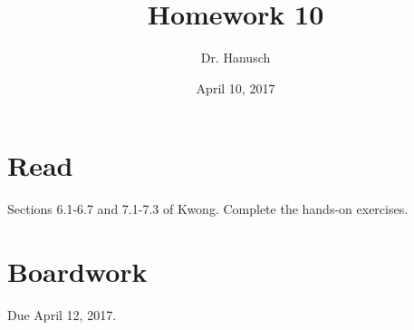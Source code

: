 \documentclass[12pt]{article}
\title{Homework 10}
\author{Dr. Hanusch}  %
\date{April 10, 2017}
\begin{document}
\newtheorem{thm}{Theorem}
\newtheorem{cor}[thm]{Corollary}
\newtheorem{lem}[thm]{Lemma}
\newtheorem{prop}[thm]{Proposition}
\theoremstyle{definition}
\newtheorem{defn}[thm]{Definition}
\newtheorem{qu}[]{Question}
\theoremstyle{remark}
\newtheorem{rem}[thm]{Remark}
\newtheorem*{prf}{Proof}

\newcommand{\norm}[1]{\left\Vert#1\right\Vert}
\newcommand{\abs}[1]{\left\vert#1\right\vert}
\newcommand{\set}[1]{\left\{#1\right\}}
\newcommand{\Real}{\mathbb R}
\newcommand{\Z}{\mathbb Z}
\newcommand{\N}{\mathbb N}
\newcommand{\eps}{\varepsilon}
\newcommand{\To}{\longrightarrow}
\newcommand{\BX}{\mathbf{B}(X)}
\newcommand{\A}{\mathcal{A}}
\newcommand{\U}{\mathcal{U}}
\newcommand{\power}{\mathscr{P}}
\newcommand{\dv}{\textrm{ div }}




\maketitle

\section{Read}

Sections 6.1-6.7 and 7.1-7.3 of Kwong. Complete the hands-on exercises.

\section{Boardwork} 

Due April 12, 2017.

\end{document}
